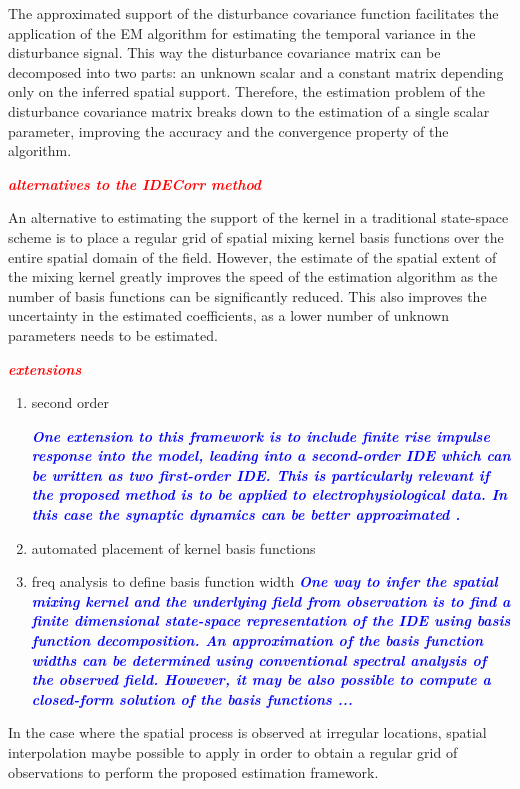\documentclass[10pt,twocolumn,twoside]{IEEEtran}
\newcommand{\dean}[1]{\textsf{\emph{\textbf{\textcolor{red}{#1}}}}}
\newcommand{\parham}[1]{\textsf{\emph{\textbf{\textcolor{blue}{#1}}}}}
\begin{document}
{The approximated support of the disturbance covariance function facilitates the application of the EM algorithm for estimating the temporal variance in the disturbance signal. This way the disturbance covariance matrix can be decomposed into two parts: an unknown scalar and a constant matrix depending only on the inferred spatial support. Therefore, the estimation problem of the disturbance covariance matrix breaks down to the estimation of a single scalar parameter, improving the accuracy and the convergence property of the algorithm.
                                                                                                                                                                     
\dean{alternatives to the IDECorr method}

An alternative to estimating the support of the kernel in a traditional state-space scheme is to place a regular grid of spatial mixing kernel basis functions over the entire spatial domain of the field. However, the estimate of the spatial extent of the mixing kernel greatly improves the speed of the estimation algorithm as the number of basis functions can be significantly reduced. This also improves the uncertainty in the estimated coefficients, as a lower number of unknown parameters needs to be estimated. 


\dean{extensions}

\begin{enumerate}
	\item second order 
 
\parham{ One extension to this framework is to include finite rise impulse response into the model, leading into a second-order IDE which can be written as two first-order IDE. This is particularly relevant if the proposed method is to be applied to electrophysiological data. In this case the synaptic dynamics can be better approximated \cite{VanRotterdam1982}.}   
	\item automated placement of kernel basis functions
	\item freq analysis to define basis function width  
	\parham{One way to infer the spatial mixing kernel and the underlying field from observation is to find a finite dimensional state-space representation of the IDE using basis function decomposition. An approximation of the basis function widths can be determined using conventional spectral analysis of the observed field. However, it may be also possible to compute a closed-form solution of the basis functions ...  }
\end{enumerate}
In the case where the spatial process is observed at irregular locations, spatial interpolation maybe possible to apply in order to obtain a regular grid of observations to perform the proposed estimation framework.




}
\end{document}
